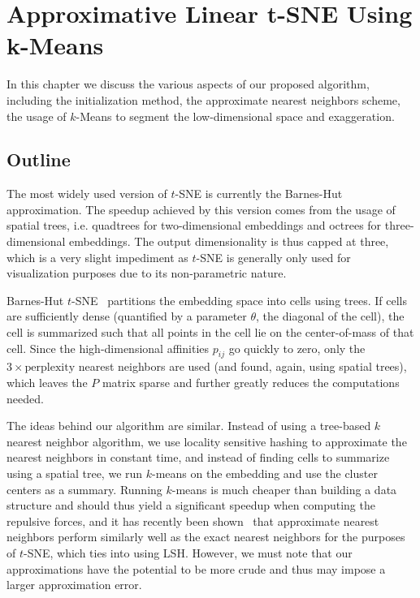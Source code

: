 \chapter{Approximative Linear t-SNE Using k-Means}\label{ch:main}

In this chapter we discuss the various aspects of our proposed algorithm, including
the initialization method, the approximate nearest neighbors scheme, the usage of
$k$-Means to segment the low-dimensional space and exaggeration.

\section{Outline}

The most widely used version of $t$-SNE is currently the Barnes-Hut
approximation.  The speedup achieved by this version comes from the usage of
spatial trees, i.e.  quadtrees for two-dimensional embeddings and octrees for
three-dimensional embeddings.  The output dimensionality is thus capped at
three, which is a very slight impediment as $t$-SNE is generally only used for
visualization purposes due to its non-parametric nature.

Barnes-Hut $t$-SNE~\cite{bhtsne} partitions the embedding space into cells using trees. If
cells are sufficiently dense (quantified by a parameter $\theta$, the diagonal
of the cell), the cell is summarized such that all points in the
cell lie on the center-of-mass of that cell. Since the high-dimensional
affinities $p_{ij}$ go quickly to zero, only the $3 \times \text{perplexity}$ nearest
neighbors are used (and found, again, using spatial trees), which leaves the
$P$ matrix sparse and further greatly reduces the computations needed.

The ideas behind our algorithm are similar. Instead of using a tree-based $k$
nearest neighbor algorithm, we use locality sensitive hashing to approximate
the nearest neighbors in constant time, and instead of finding cells to
summarize using a spatial tree, we run $k$-means on the embedding and use the
cluster centers as a summary. Running $k$-means is much cheaper than building a
data structure and should thus yield a significant speedup when computing the
repulsive forces, and it has recently been shown~\cite{fitsne} that approximate
nearest neighbors perform similarly well as the exact nearest neighbors for the
purposes of $t$-SNE, which ties into using LSH. However, we must note that our
approximations have the potential to be more crude and thus may impose a larger
approximation error.


